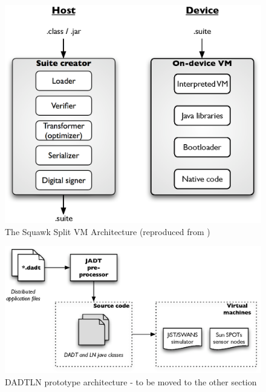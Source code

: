 \begin{figure}
\centering
\label{Fig:SquawkVM_architecture}
\includegraphics[scale=0.71]{img/Squawk_architecture.eps} \caption[The Squawk
Split VM Architecture]{The Squawk
Split VM Architecture (reproduced from \cite{simon_squawk:2006})}
\end{figure}   
  
\begin{figure}
\centering
\label{Fig:DADTLN_architecture}
\includegraphics[scale=0.71]{img/DADTLN_architecture.eps} \caption[DADTLN
prototype architecture - to be renamed]{DADTLN prototype architecture - to
be moved to the other section}
\end{figure} 
